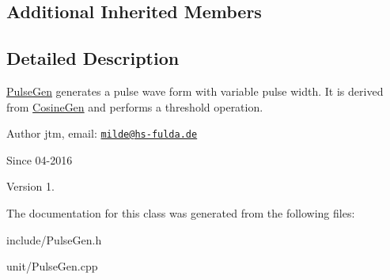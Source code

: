 \subsection*{Additional Inherited Members}


\subsection{Detailed Description}
\hyperlink{classunit_1_1PulseGen}{Pulse\-Gen} generates a pulse wave form with variable pulse width. It is derived from \hyperlink{classunit_1_1CosineGen}{Cosine\-Gen} and performs a threshold operation.

\begin{DoxyAuthor}{Author}
jtm, email\-:  \href{mailto:milde@hs-fulda.de}{\tt milde@hs-\/fulda.\-de} 
\end{DoxyAuthor}
\begin{DoxySince}{Since}
04-\/2016 
\end{DoxySince}
\begin{DoxyVersion}{Version}
1. 
\end{DoxyVersion}


The documentation for this class was generated from the following files\-:\begin{DoxyCompactItemize}
\item 
include/Pulse\-Gen.\-h\item 
unit/Pulse\-Gen.\-cpp\end{DoxyCompactItemize}
